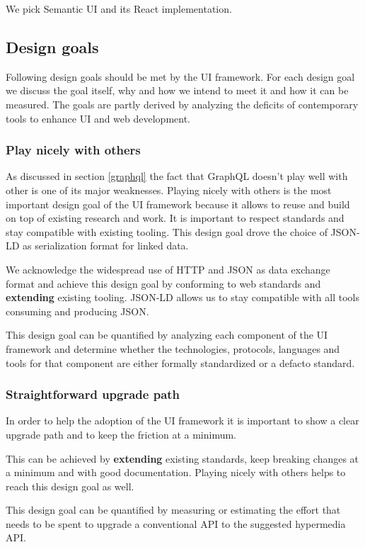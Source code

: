 We pick Semantic UI and its React implementation.

\subsection{Design goals}
Following design goals should be met by the UI framework. For each design goal we discuss the goal itself, why and how we intend to meet it and how it can be measured.
The goals are partly derived by analyzing the deficits of contemporary tools to enhance UI and web development.

\subsubsection{Play nicely with others}
As discussed in section \ref{graphql} the fact that GraphQL doesn't play well with other is one of its major weaknesses. Playing nicely with others is the most important design goal of the UI framework because it allows to reuse and build on top of existing research and work.
It is important to respect standards and stay compatible with existing tooling. This design goal drove the choice of JSON-LD as serialization format for linked data.

We acknowledge the widespread use of HTTP and JSON as data exchange format and achieve this design goal by conforming to web standards and \textbf{extending} existing tooling. JSON-LD allows us to stay compatible with all tools consuming and producing JSON.

This design goal can be quantified by analyzing each component of the UI framework and determine whether the technologies, protocols, languages and tools for that component are either formally standardized or a defacto standard.

\subsubsection{Straightforward upgrade path}
In order to help the adoption of the UI framework it is important to show a clear upgrade path and to keep the friction at a minimum.

This can be achieved by \textbf{extending} existing standards, keep breaking changes at a minimum and with good documentation. Playing nicely with others helps to reach this design goal as well.

This design goal can be quantified by measuring or estimating the effort that needs to be spent to upgrade a conventional API to the suggested hypermedia API.


